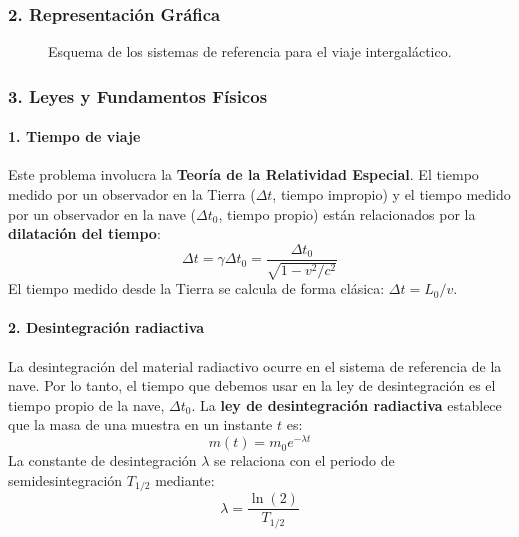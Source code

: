 \subsubsection*{2. Representación Gráfica}
\begin{figure}[H]
    \centering
    \caption{Esquema de los sistemas de referencia para el viaje intergaláctico.}
\end{figure}

\subsubsection*{3. Leyes y Fundamentos Físicos}
\paragraph*{1. Tiempo de viaje}
Este problema involucra la \textbf{Teoría de la Relatividad Especial}.
El tiempo medido por un observador en la Tierra ($\Delta t$, tiempo impropio) y el tiempo medido por un observador en la nave ($\Delta t_0$, tiempo propio) están relacionados por la \textbf{dilatación del tiempo}:
$$\Delta t = \gamma \Delta t_0 = \frac{\Delta t_0}{\sqrt{1-v^2/c^2}}$$
El tiempo medido desde la Tierra se calcula de forma clásica: $\Delta t = L_0/v$.

\paragraph*{2. Desintegración radiactiva}
La desintegración del material radiactivo ocurre en el sistema de referencia de la nave. Por lo tanto, el tiempo que debemos usar en la ley de desintegración es el tiempo propio de la nave, $\Delta t_0$.
La \textbf{ley de desintegración radiactiva} establece que la masa de una muestra en un instante $t$ es:
$$m(t) = m_0 e^{-\lambda t}$$
La constante de desintegración $\lambda$ se relaciona con el periodo de semidesintegración $T_{1/2}$ mediante:
$$\lambda = \frac{\ln(2)}{T_{1/2}}$$

